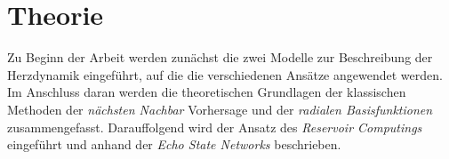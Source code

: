 \chapter{Theorie}
\label{ch:theory}
Zu Beginn der Arbeit werden zunächst die zwei Modelle zur Beschreibung der Herzdynamik eingeführt, auf die die verschiedenen Ansätze angewendet werden. Im Anschluss daran werden die theoretischen Grundlagen der klassischen Methoden der \textit{nächsten Nachbar} Vorhersage und der \textit{radialen Basisfunktionen} zusammengefasst. Darauffolgend wird der Ansatz des \textit{Reservoir Computings} eingeführt und anhand der \textit{Echo State Networks} beschrieben.




